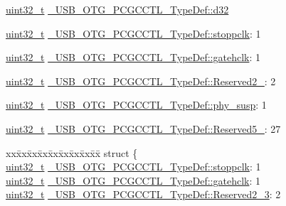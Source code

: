 \begin{DoxyCompactItemize}
\begin{tabbing}
\end{tabbing}\item 
\hyperlink{stdint_8h_a435d1572bf3f880d55459d9805097f62}{uint32\-\_\-t} \hyperlink{group___u_s_b___o_t_g___d_r_i_v_e_r_ga2e1fd814ad3ab867005461a0766b0ae4}{\-\_\-\-U\-S\-B\-\_\-\-O\-T\-G\-\_\-\-P\-C\-G\-C\-C\-T\-L\-\_\-\-Type\-Def\-::d32}
\item 
\hyperlink{stdint_8h_a435d1572bf3f880d55459d9805097f62}{uint32\-\_\-t} \hyperlink{group___u_s_b___o_t_g___d_r_i_v_e_r_gada5828fd50c36f5120978fa214b87dda}{\-\_\-\-U\-S\-B\-\_\-\-O\-T\-G\-\_\-\-P\-C\-G\-C\-C\-T\-L\-\_\-\-Type\-Def\-::stoppclk}\-: 1
\item 
\hyperlink{stdint_8h_a435d1572bf3f880d55459d9805097f62}{uint32\-\_\-t} \hyperlink{group___u_s_b___o_t_g___d_r_i_v_e_r_gae554e8c7914ce8d2eb106586fdbbc76d}{\-\_\-\-U\-S\-B\-\_\-\-O\-T\-G\-\_\-\-P\-C\-G\-C\-C\-T\-L\-\_\-\-Type\-Def\-::gatehclk}\-: 1
\item 
\hyperlink{stdint_8h_a435d1572bf3f880d55459d9805097f62}{uint32\-\_\-t} \hyperlink{group___u_s_b___o_t_g___d_r_i_v_e_r_gabc16bbefeb0572fe4e11610b2b65edf9}{\-\_\-\-U\-S\-B\-\_\-\-O\-T\-G\-\_\-\-P\-C\-G\-C\-C\-T\-L\-\_\-\-Type\-Def\-::\-Reserved2\-\_}\-: 2
\item 
\hyperlink{stdint_8h_a435d1572bf3f880d55459d9805097f62}{uint32\-\_\-t} \hyperlink{group___u_s_b___o_t_g___d_r_i_v_e_r_ga535f75e5436b75614c13d56c654a2b49}{\-\_\-\-U\-S\-B\-\_\-\-O\-T\-G\-\_\-\-P\-C\-G\-C\-C\-T\-L\-\_\-\-Type\-Def\-::phy\-\_\-susp}\-: 1
\item 
\hyperlink{stdint_8h_a435d1572bf3f880d55459d9805097f62}{uint32\-\_\-t} \hyperlink{group___u_s_b___o_t_g___d_r_i_v_e_r_ga0a01d405634299e9f2312062b60786ba}{\-\_\-\-U\-S\-B\-\_\-\-O\-T\-G\-\_\-\-P\-C\-G\-C\-C\-T\-L\-\_\-\-Type\-Def\-::\-Reserved5\-\_}\-: 27
\item 
\begin{tabbing}
xx\=xx\=xx\=xx\=xx\=xx\=xx\=xx\=xx\=\kill
struct \{\\
\>\hyperlink{stdint_8h_a435d1572bf3f880d55459d9805097f62}{uint32\_t} \hyperlink{group___u_s_b___o_t_g___d_r_i_v_e_r_gada5828fd50c36f5120978fa214b87dda}{\_USB\_OTG\_PCGCCTL\_TypeDef::stoppclk}: 1\\
\>\hyperlink{stdint_8h_a435d1572bf3f880d55459d9805097f62}{uint32\_t} \hyperlink{group___u_s_b___o_t_g___d_r_i_v_e_r_gae554e8c7914ce8d2eb106586fdbbc76d}{\_USB\_OTG\_PCGCCTL\_TypeDef::gatehclk}: 1\\
\>\hyperlink{stdint_8h_a435d1572bf3f880d55459d9805097f62}{uint32\_t} \hyperlink{group___u_s_b___o_t_g___d_r_i_v_e_r_gabc16bbefeb0572fe4e11610b2b65edf9}{\_USB\_OTG\_PCGCCTL\_TypeDef::Reserved2\_3}: 2\\

\end{tabbing}
\end{DoxyCompactItemize}
